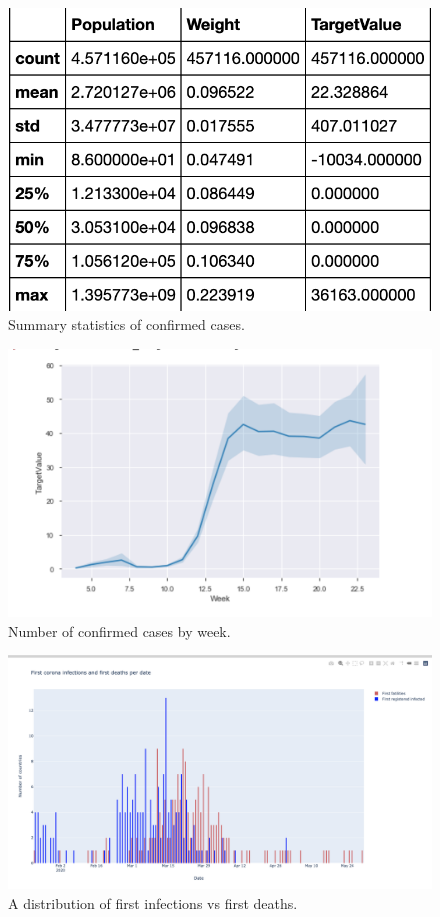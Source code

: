 \documentclass{article}
\begin{document}
\begin{figure}
  \centering
  \includegraphics[width=\columnwidth]{confirmed_cases_summary_statistics.png}
  \caption{Summary statistics of confirmed cases.}
\end{figure}
\begin{figure}
  \centering
  \includegraphics[width=\columnwidth]{week_vs_confirmed_cases.png}
  \caption{Number of confirmed cases by week.}
\end{figure}
\begin{figure}
  \centering
  \includegraphics[width=\columnwidth]{first_infection_first_deaths.png}
  \caption{A distribution of first infections vs first deaths.}
\end{figure}
\end{document}
